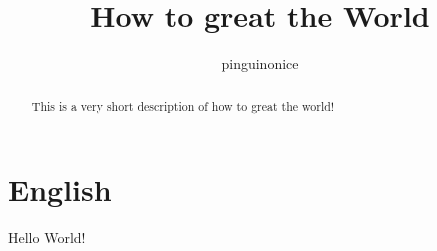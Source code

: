 \documentclass[]{article} %
\title{How to great the World} %
\author{pinguinonice} %
\begin{document}
	
	\maketitle %
	
	\begin{abstract} %
		This is a very short description of how to great the world!
	\end{abstract} %
	
	\section{English} %
	Hello World!
\end{document}
